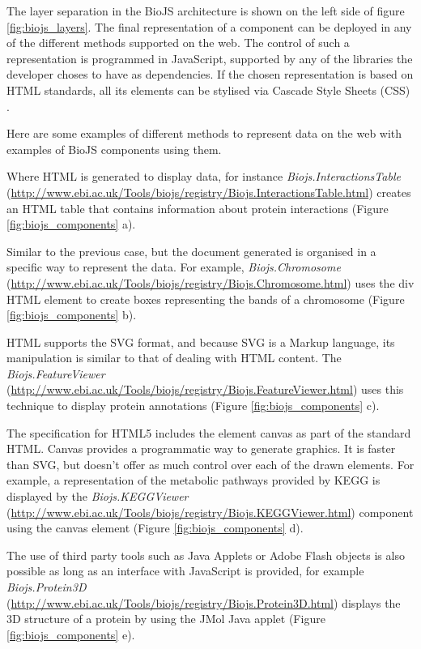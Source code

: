 The layer separation in the BioJS architecture is shown on the left side of figure \ref{fig:biojs_layers}. The final representation of a component can be deployed in any of the different methods supported on the web. The control of such a representation is programmed in JavaScript, supported by any of the libraries the developer choses to have as dependencies. If the chosen representation is based on HTML standards, all its elements can be stylised via Cascade Style Sheets (CSS) \cite{COR2014}.

Here are some examples of different methods to represent data on the web with examples of BioJS components using them.
\begin{description}
\setlength\itemsep{-0.3em}
\item[HTML documents] Where HTML is generated to display data, for instance \emph{Biojs.InteractionsTable} (\url{http://www.ebi.ac.uk/Tools/biojs/registry/Biojs.InteractionsTable.html}) creates an HTML table that contains information about protein interactions (Figure \ref{fig:biojs_components} a).
\item[Visualizations using HTML elements] Similar to the previous case, but the document generated is organised in a specific way to represent the data. For example,  \emph{Biojs.Chromosome} (\url{http://www.ebi.ac.uk/Tools/biojs/registry/Biojs.Chromosome.html}) uses the div HTML element to create boxes representing the bands of a chromosome (Figure \ref{fig:biojs_components} b).
\item[Scalable Vector Graphics] HTML supports the SVG format, and because SVG is a Markup language, its manipulation is similar to that of dealing with HTML content. The \emph{Biojs.FeatureViewer} (\url{http://www.ebi.ac.uk/Tools/biojs/registry/Biojs.FeatureViewer.html}) uses this technique to display protein annotations (Figure \ref{fig:biojs_components} c).
\item[HTML canvas] The specification for HTML5 includes the element canvas as part of the standard HTML. Canvas provides a programmatic way to generate graphics. It is faster than SVG, but doesn't offer as much control over each of the drawn elements. For example, a representation of the metabolic pathways provided by KEGG is displayed by the \emph{Biojs.KEGGViewer} (\url{http://www.ebi.ac.uk/Tools/biojs/registry/Biojs.KEGGViewer.html}) component using the canvas element (Figure \ref{fig:biojs_components} d).
\item[Browser plugins] The use of third party tools such as Java Applets or Adobe Flash objects is also possible as long as an interface with JavaScript is provided, for example \emph{Biojs.Protein3D} (\url{http://www.ebi.ac.uk/Tools/biojs/registry/Biojs.Protein3D.html}) displays the 3D structure of a protein by using the JMol Java applet (Figure \ref{fig:biojs_components} e).
\end{description}

